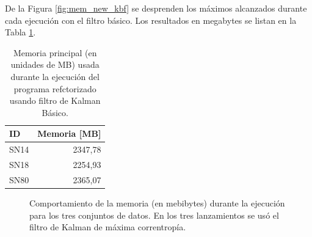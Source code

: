 De la Figura \ref{fig:mem_new_kbf} se desprenden los m\'aximos alcanzados durante cada ejecuci\'on con el filtro b\'asico. Los resultados en megabytes se listan en la Tabla \ref{tab:mem3}.
\pagebreak

\begin{table}[h!]
\centering
\caption{Memoria principal (en unidades de MB) usada durante la ejecuci\'on del programa refctorizado usando filtro de Kalman B\'asico.}
\begin{tabular}{|l|r|}
\hline
\textbf{ID} & Memoria [MB]\\\hline\hline
SN14 & 2347,78\\\hline
SN18 & 2254,93\\\hline
SN80 & 2365,07\\\hline
\end{tabular}
\label{tab:mem3}
\end{table}


\begin{figure}[h!]
\centering
{}\hfill
{}\vfill
{}
\caption{Comportamiento de la memoria (en mebibytes) durante la ejecuci\'on para los tres conjuntos de datos. En los tres lanzamientos se us\'o el filtro de Kalman de m\'axima correntrop\'ia.}
\label{fig:mem_new_mcc}
\end{figure}

